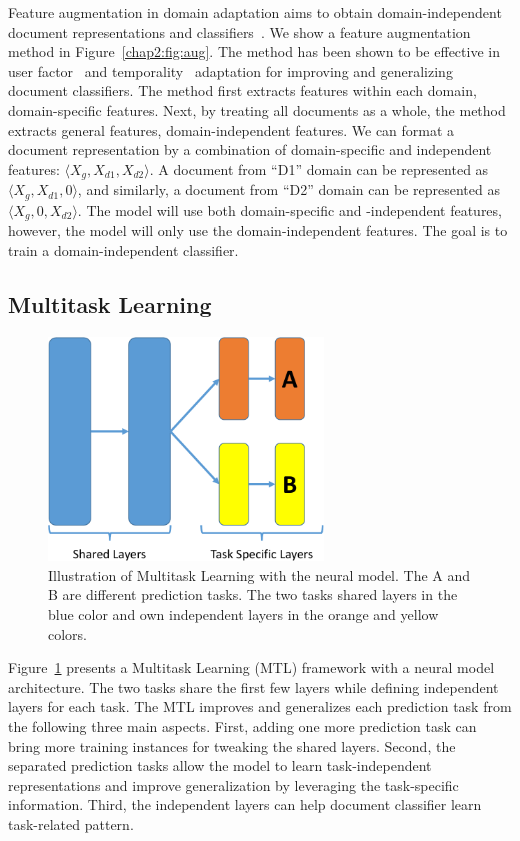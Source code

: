 Feature augmentation in domain adaptation aims to obtain domain-independent document representations and classifiers~\cite{blitzer2006domain, daume2007frustratingly}.
We show a feature augmentation method in Figure~\ref{chap2:fig:aug}.
The method has been shown to be effective in user factor~\cite{lynn2017human} and temporality~\cite{huang2018examining} adaptation for improving and generalizing document classifiers.
The method first extracts features within each domain, domain-specific features.
Next, by treating all documents as a whole, the method extracts general features, domain-independent features.
We can format a document representation by a combination of domain-specific and independent features: $\langle X_g, X_{d1}, X_{d2} \rangle$.
A document from ``D1'' domain can be represented as $\langle X_g, X_{d1}, 0 \rangle$, and similarly, a document from ``D2'' domain can be represented as $\langle X_g, 0, X_{d2} \rangle$. 
The model will use both domain-specific and -independent features, however, the model will only use the domain-independent features.
The goal is to train a domain-independent classifier.


\subsection{Multitask Learning}

\begin{figure}[tb!]
\centering
\includegraphics[width=0.65\textwidth]{images/chapter2/multitask.pdf}
\caption{Illustration of Multitask Learning with the neural model. The A and B are different prediction tasks. The two tasks shared layers in the blue color and own independent layers in the orange and yellow colors.}
\label{chap2:fig:mtl}
\end{figure}

Figure~\ref{chap2:fig:mtl} presents a Multitask Learning (MTL) framework with a neural model architecture.
The two tasks share the first few layers while defining independent layers for each task.
The MTL improves and generalizes each prediction task from the following three main aspects.
First, adding one more prediction task can bring more training instances for tweaking the shared layers. 
Second, the separated prediction tasks allow the model to learn task-independent representations and improve generalization by leveraging the task-specific information.
Third, the independent layers can help document classifier learn task-related pattern.

